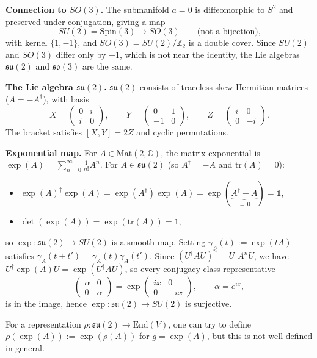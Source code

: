 {    \medskip\noindent\textbf{Connection to $SO(3)$.}\quad{}
    The submanifold $a=0$ is diffeomorphic to $S^2$ and preserved under conjugation, giving a map
    \[
        SU(2)=\mathrm{Spin}(3)\longrightarrow SO(3)\qquad\text{(not a bijection),}
    \]
    with kernel $\{1,-1\}$, and $SO(3)=SU(2)/\mathbb{Z}_2$ is a double cover.
    Since $SU(2)$ and $SO(3)$ differ only by $-1$, which is not near the identity, the Lie algebras $\mathfrak{su}(2)$ and $\mathfrak{so}(3)$ are the same.

    \medskip\noindent\textbf{The Lie algebra $\mathfrak{su}(2)$.}\quad{}
    $\mathfrak{su}(2)$ consists of traceless skew-Hermitian matrices ($A=-A^\dagger$), with basis
    \[
        X=\begin{pmatrix}0&i\\i&0\end{pmatrix},\qquad
        Y=\begin{pmatrix}0&1\\-1&0\end{pmatrix},\qquad
        Z=\begin{pmatrix}i&0\\0&-i\end{pmatrix}.
    \]
    The bracket satisfies $[X,Y]=2Z$ and cyclic permutations.

    \medskip\noindent\textbf{Exponential map.}\quad{}
    For $A\in\mathrm{Mat}(2,\mathbb{C})$, the matrix exponential is $\exp(A)=\sum_{n=0}^\infty\frac{1}{n!}A^n$.
    For $A\in\mathfrak{su}(2)$ (so $A^\dagger=-A$ and $\mathrm{tr}(A)=0$):
    \begin{itemize}
        \item ${\exp(A)}^\dagger\exp(A)=\exp(A^\dagger)\exp(A)=\exp(\underbrace{A^\dagger+A}_{=\,0})=\mathbb{1}$,
        \item $\det(\exp(A))=\exp(\mathrm{tr}(A))=1$,
    \end{itemize}
    so $\exp\colon\mathfrak{su}(2)\to SU(2)$ is a smooth map. Setting $\gamma_A(t):=\exp(tA)$ satisfies
    $\gamma_A(t+t')=\gamma_A(t)\gamma_A(t')$.
    Since ${(U^\dagger AU)}^n=U^\dagger A^n U$, we have $U^\dagger\exp(A)U=\exp(U^\dagger AU)$,
    so every conjugacy-class representative
    \[
        \begin{pmatrix}\alpha&0\\0&\bar\alpha\end{pmatrix}
        =\exp\!\begin{pmatrix}ix&0\\0&-ix\end{pmatrix},
        \qquad\alpha=e^{ix},
    \]
    is in the image, hence $\exp\colon\mathfrak{su}(2)\to SU(2)$ is surjective.

    For a representation $\rho\colon\mathfrak{su}(2)\to\mathrm{End}(V)$, one can try to define
    $\rho(\exp(A)):=\exp(\rho(A))$ for $g=\exp(A)$, but this is not well defined in general.
}

